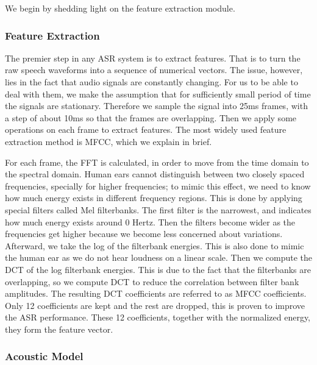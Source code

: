 We begin by shedding light on the feature extraction module.


\subsubsection{Feature Extraction} 
\label{bg:sub5}



The premier step in any \ac{ASR} system is to extract features. That is to turn the raw speech waveforms into a sequence of numerical vectors. The issue, however, lies in the fact that audio signals are constantly changing. For us to be able to deal with them, we make the assumption that for sufficiently small period of time the signals are stationary. Therefore we sample the signal into 25ms frames, with a step of about 10ms so that the frames are overlapping. Then we apply some operations on each frame to extract features. The most widely used feature extraction method is \ac{MFCC}, which we explain in brief.

For each frame, the \ac{FFT} is calculated, in order to move from the time domain to the spectral domain. Human ears cannot distinguish between two closely spaced frequencies, specially for higher frequencies; to mimic this effect, we need to know how much energy exists in different frequency regions. This is done by applying special filters called Mel filterbanks. The first filter is the narrowest, and indicates how much energy exists around 0 Hertz. Then the filters become wider as the frequencies get higher because we become less concerned about variations. 
Afterward, we take the log of the filterbank energies. This is also done to mimic the human ear as we do not hear loudness on a linear scale. 
Then we compute the \ac{DCT} of the log filterbank energies. This is due to the fact that the filterbanks are overlapping, so we compute \ac{DCT} to reduce the correlation between filter bank amplitudes. The resulting \ac{DCT} coefficients are referred to as MFCC coefficients. Only 12 coefficients are kept and the rest are dropped, this is proven to improve the \ac{ASR} performance. These 12 coefficients, together with the normalized energy, they form the feature vector.

\subsubsection{Acoustic Model} 
\label{bg:subsub6}

